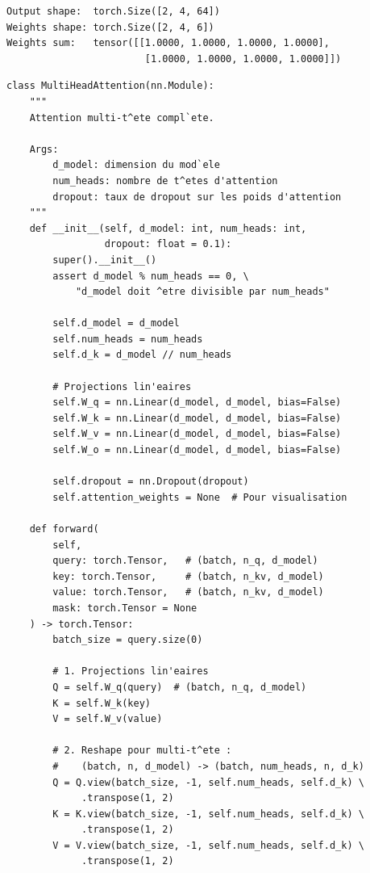 \begin{codeoutput}
\begin{verbatim}
Output shape:  torch.Size([2, 4, 64])
Weights shape: torch.Size([2, 4, 6])
Weights sum:   tensor([[1.0000, 1.0000, 1.0000, 1.0000],
                        [1.0000, 1.0000, 1.0000, 1.0000]])
\end{verbatim}
\end{codeoutput}

\begin{codeblock}[title=\textbf{Multi-Head Attention compl\`ete}]
\begin{verbatim}
class MultiHeadAttention(nn.Module):
    """
    Attention multi-t^ete compl`ete.

    Args:
        d_model: dimension du mod`ele
        num_heads: nombre de t^etes d'attention
        dropout: taux de dropout sur les poids d'attention
    """
    def __init__(self, d_model: int, num_heads: int,
                 dropout: float = 0.1):
        super().__init__()
        assert d_model % num_heads == 0, \
            "d_model doit ^etre divisible par num_heads"

        self.d_model = d_model
        self.num_heads = num_heads
        self.d_k = d_model // num_heads

        # Projections lin'eaires
        self.W_q = nn.Linear(d_model, d_model, bias=False)
        self.W_k = nn.Linear(d_model, d_model, bias=False)
        self.W_v = nn.Linear(d_model, d_model, bias=False)
        self.W_o = nn.Linear(d_model, d_model, bias=False)

        self.dropout = nn.Dropout(dropout)
        self.attention_weights = None  # Pour visualisation

    def forward(
        self,
        query: torch.Tensor,   # (batch, n_q, d_model)
        key: torch.Tensor,     # (batch, n_kv, d_model)
        value: torch.Tensor,   # (batch, n_kv, d_model)
        mask: torch.Tensor = None
    ) -> torch.Tensor:
        batch_size = query.size(0)

        # 1. Projections lin'eaires
        Q = self.W_q(query)  # (batch, n_q, d_model)
        K = self.W_k(key)
        V = self.W_v(value)

        # 2. Reshape pour multi-t^ete :
        #    (batch, n, d_model) -> (batch, num_heads, n, d_k)
        Q = Q.view(batch_size, -1, self.num_heads, self.d_k) \
             .transpose(1, 2)
        K = K.view(batch_size, -1, self.num_heads, self.d_k) \
             .transpose(1, 2)
        V = V.view(batch_size, -1, self.num_heads, self.d_k) \
             .transpose(1, 2)


\end{verbatim}
\end{codeblock}
